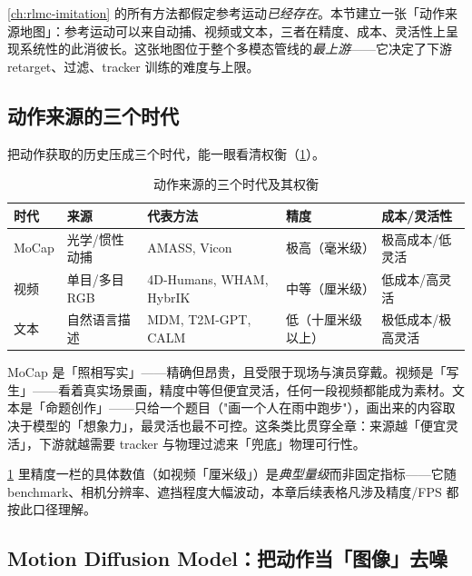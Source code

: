 \cref{ch:rlmc-imitation} 的所有方法都假定参考运动\emph{已经存在}。本节建立一张「动作来源地图」：参考运动可以来自动捕、视频或文本，三者在精度、成本、灵活性上呈现系统性的此消彼长。这张地图位于整个多模态管线的\emph{最上游}——它决定了下游 retarget、过滤、tracker 训练的难度与上限。

\subsection{动作来源的三个时代}
\label{sec:rlmc-mm-spectrum-eras}

把动作获取的历史压成三个时代，能一眼看清权衡（\cref{tab:rlmc-mm-eras}）。

\begin{table}[ht]
\centering
\small
\caption{动作来源的三个时代及其权衡}
\label{tab:rlmc-mm-eras}
\begin{tabular}{@{}lllll@{}}
\toprule
时代 & 来源 & 代表方法 & 精度 & 成本{/}灵活性 \\
\midrule
MoCap & 光学{/}惯性动捕 & AMASS, Vicon & 极高（毫米级） & 极高成本{/}低灵活 \\
视频 & 单目{/}多目 RGB & 4D-Humans, WHAM, HybrIK & 中等（厘米级） & 低成本{/}高灵活 \\
文本 & 自然语言描述 & MDM, T2M-GPT, CALM & 低（十厘米级以上） & 极低成本{/}极高灵活 \\
\bottomrule
\end{tabular}
\end{table}

\begin{insight}[三个时代像绘画的三种方式]\label{ins:rlmc-mm-painting}
MoCap 是「照相写实」——精确但昂贵，且受限于现场与演员穿戴。视频是「写生」——看着真实场景画，精度中等但便宜灵活，任何一段视频都能成为素材。文本是「命题创作」——只给一个题目（"画一个人在雨中跑步"），画出来的内容取决于模型的「想象力」，最灵活也最不可控。这条类比贯穿全章：来源越「便宜灵活」，下游就越需要 tracker 与物理过滤来「兜底」物理可行性。
\end{insight}

\cref{tab:rlmc-mm-eras} 里精度一栏的具体数值（如视频「厘米级」）是\emph{典型量级}而非固定指标——它随 benchmark、相机分辨率、遮挡程度大幅波动，本章后续表格凡涉及精度/FPS 都按此口径理解。

\subsection{Motion Diffusion Model：把动作当「图像」去噪}
\label{sec:rlmc-mm-mdm}

